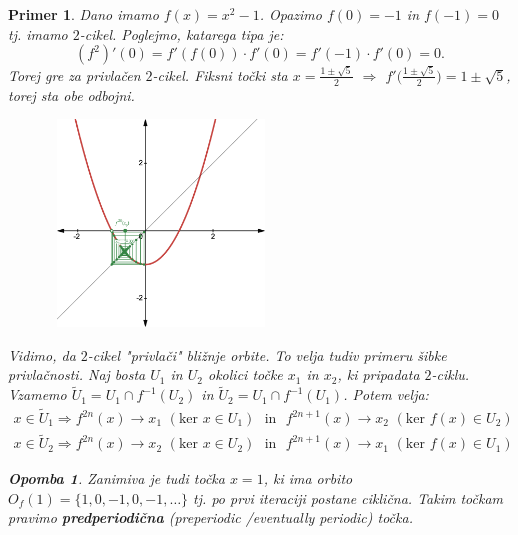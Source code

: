 \documentclass{article}
\newtheorem{opomba}{Opomba}
\newtheorem{primer}{Primer}
\begin{document}
\newpage

\begin{primer}
Dano imamo $f(x) = x^2 - 1$. Opazimo $f(0) = -1$ in $f(-1) = 0$ tj. imamo $2$-cikel. Poglejmo, katarega tipa je:
$$
(f^2)'(0) = f'(f(0)) \cdot f'(0) = f'(-1)\cdot f'(0) = 0.
$$
Torej gre za privlačen $2$-cikel. Fiksni točki sta $x = \frac{1 \pm \sqrt{5}}{2}$
$\Longrightarrow$ $f'\Big(\frac{1 \pm \sqrt{5}}{2}\Big) = 1 \pm \sqrt{5}$, torej 
sta obe odbojni.
\begin{figure}[h!]
    \begin{centering}
        
    \includegraphics[width=6cm, height=5.5cm]{Grafi/cobweb6.png}
    \end{centering}
\end{figure}    
\noindent
Vidimo, da $2$-cikel "privlači" bližnje orbite. To velja tudiv primeru 
šibke privlačnosti. Naj bosta $U_1$ in $U_2$ okolici točke $x_1$ in $x_2$,
ki pripadata $2$-ciklu. Vzamemo $\tilde{U}_1 = U_1\cap f^{-1}(U_2)$ in 
$\tilde{U}_2 = U_1\cap f^{-1}(U_1)$. Potem velja:
\begin{align*}
x\in \tilde{U}_1 \Longrightarrow f^{2n}(x) \rightarrow x_1 \,\,(\text{ker } x\in U_1)\,\, \text{ in }\,\, f^{2n+1}(x) \rightarrow x_2 \,\,(\text{ker } f(x)\in U_2)\\
x\in \tilde{U}_2 \Longrightarrow f^{2n}(x) \rightarrow x_2 \,\,(\text{ker } x\in U_2)\,\, \text{ in }\,\, f^{2n+1}(x) \rightarrow x_1 \,\,(\text{ker } f(x)\in U_1)
\end{align*}


\begin{opomba}
Zanimiva je tudi točka $x = 1$, ki ima orbito $O_f(1) = \{1, 0, -1, 0, -1, \dots\}$ 
tj. po prvi iteraciji postane ciklična. Takim točkam pravimo \textbf{predperiodična} 
(preperiodic \slash eventually periodic) točka.
\end{opomba}
\end{primer}
\end{document}
